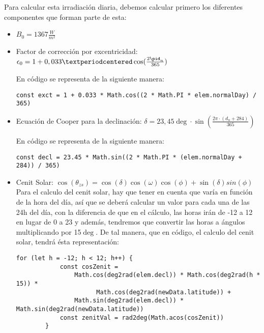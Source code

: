 Para calcular esta irradiación diaria, debemos calcular primero los diferentes componentes que forman parte de esta:
\begin{itemize}
\item $B_{0} = 1367 \frac{W}{m^2}$
\item Factor de corrección por excentricidad: $\epsilon_0 = 1 + 0,033 · \cos(\frac{2\pid_n}{365})$

En código se representa de la siguiente manera:
\begin{lstlisting}[style=ES6, caption={Factor de corrección por excentricidad}]
		const exct = 1 + 0.033 * Math.cos((2 * Math.PI * elem.normalDay) / 365)
\end{lstlisting}
\item Ecuación de Cooper para la declinación: $\delta = 23,45\deg · \sin(\frac{2\pi·(d_n+284)}{365})$

En código se representa de la siguiente manera:
\begin{lstlisting}[style=ES6, caption={Ecuación de Cooper para declinación}]
		const decl = 23.45 * Math.sin((2 * Math.PI * (elem.normalDay + 284)) / 365)
\end{lstlisting}
\item Cenit Solar: $\cos(\theta_{zs}) = \cos(\delta)\cos(\omega)\cos(\phi) + \sin(\delta)sin(\phi)$\\

Para el calculo del cenit solar, hay que tener en cuenta que varía en función de la hora del día, así que se deberá calcular un valor para cada una de las 24h del día, con la diferencia de que en el cálculo, las horas irán de -12 a 12 en lugar de 0 a 23 y además, tendremos que convertir las horas a ángulos multiplicando por 15$\deg$. De tal manera, que en código, el calculo del cenit solar, tendrá ésta representación:\\
\begin{lstlisting}[style=ES6, caption={Cálculo del cenit solar}]
		for (let h = -12; h < 12; h++) {
			const cosZenit =
				Math.cos(deg2rad(elem.decl)) * Math.cos(deg2rad(h * 15)) * 	
					  Math.cos(deg2rad(newData.latitude)) +
				Math.sin(deg2rad(elem.decl)) * Math.sin(deg2rad(newData.latitude))
			const zenitVal = rad2deg(Math.acos(cosZenit))
		}
\end{lstlisting}
\end{itemize}

